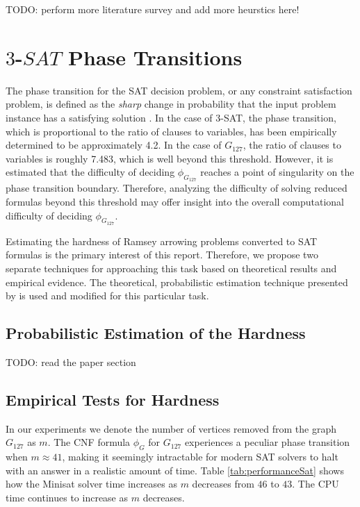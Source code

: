 \documentclass[paper=a4, fontsize=11pt]{scrartcl} %
\newcommand{\TODO}{{\color{red}TODO}}
\begin{document}
\TODO: perform more literature survey and add more heurstics here!


\section{$3$-$SAT$ Phase Transitions}
The phase transition for the SAT decision problem, or any constraint satisfaction
problem, is defined as the \emph{sharp} change in probability that
the input problem instance has a satisfying solution \cite{exploiting a theory of phase transitions in 3-satisfiability problems}.
In the case of 3-SAT, the phase transition, which is proportional to the ratio of
clauses to variables, has been empirically determined to be approximately 4.2.
In the case of $G_{127}$, the ratio of clauses to variables is roughly 7.483, 
which is well beyond this threshold. However, it is estimated that
the difficulty of deciding $\phi_{G_{127}}$ reaches a point of singularity
on the phase transition boundary. Therefore, analyzing the difficulty of solving
reduced formulas beyond this threshold may offer insight into the overall computational 
difficulty of deciding $\phi_{G_{127}}$.

Estimating the hardness of Ramsey arrowing problems converted to SAT formulas 
is the primary interest of this report. Therefore, we propose two separate
techniques for approaching this task based on theoretical results and empirical
evidence. The theoretical, probabilistic estimation technique presented by 
\cite{same as above} is used and modified for this particular task. 

\subsection{Probabilistic Estimation of the Hardness}
\TODO: read the paper section


\subsection{Empirical Tests for Hardness}
In our experiments we denote the number of vertices removed from the graph $G_{127}$ as $m$.
The CNF formula $\phi_G$ for $G_{127}$ experiences a peculiar phase transition when $m \approx 41$,
making it seemingly intractable for modern SAT solvers to halt with an answer in a realistic 
amount of time. Table \ref{tab:performanceSat} shows how the Minisat solver time increases 
as $m$ decreases from $46$ to $43$. The CPU time continues to increase as $m$ decreases.
\end{document}
